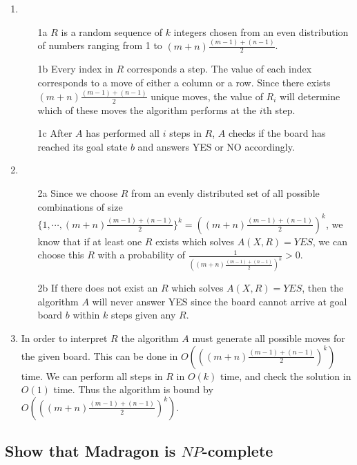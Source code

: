 \documentclass[12pt]{article}
\begin{document}
\begin{enumerate}
    \item
        \begin{enumerate}
            \item[1a] $R$ is a random sequence of $k$ integers chosen from an even distribution of numbers ranging from 1 to $(m+n)\frac{(m-1)+(n-1)}{2}$.
            \item[1b] Every index in $R$ corresponds a step. The value of each index corresponds to a move of either a column or a row. Since there exists $(m+n)\frac{(m-1)+(n-1)}{2}$ unique moves, the value of $R_i$ will determine which of these moves the algorithm performs at the $i$th step.
            \item[1c] After $A$ has performed all $i$ steps in $R$, $A$ checks if the board has reached its goal state $b$ and answers YES or NO accordingly.
        \end{enumerate}
    \item
        \begin{enumerate}
            \item[2a] Since we choose $R$ from an evenly distributed set of all possible combinations of size $\{1, \cdots, (m+n)\frac{(m-1)+(n-1)}{2}\}^k = ((m+n)\frac{(m-1)+(n-1)}{2})^k$, we know that if at least one $R$ exists which solves $A(X, R) = YES$, we can choose this $R$ with a probability of $\frac{1}{((m+n)\frac{(m-1)+(n-1)}{2})^k} > 0$.
            \item[2b] If there does not exist an $R$ which solves $A(X, R) = YES$, then the algorithm $A$ will never answer YES since the board cannot arrive at goal board $b$ within $k$ steps given any $R$.
        \end{enumerate}
    \item
        In order to interpret $R$ the algorithm $A$ must generate all possible moves for the given board. This can be done in $O(((m+n)\frac{(m-1)+(n-1)}{2})^k)$ time. We can perform all steps in $R$ in $O(k)$ time, and check the solution in $O(1)$ time.
        Thus the algorithm is bound by $O(((m+n)\frac{(m-1)+(n-1)}{2})^k)$.
\end{enumerate}

\subsection{Show that Madragon is $NP$-complete}
\label{sub:Show that Madragon is $NP$-complete}
\end{document}
